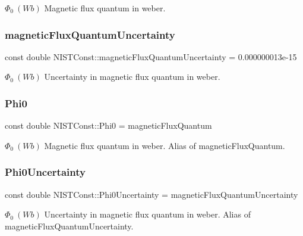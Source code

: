 $\Phi_0 \ (Wb)$ Magnetic flux quantum in weber. \mbox{\label{group___n_i_s_t_const-_magnetic_flux_quantum_gabb501bffb2a565762d9f4bde15f859b6}} 
\subsubsection{\texorpdfstring{magnetic\+Flux\+Quantum\+Uncertainty}{magneticFluxQuantumUncertainty}}
{\footnotesize\ttfamily const double N\+I\+S\+T\+Const\+::magnetic\+Flux\+Quantum\+Uncertainty = 0.\+000000013e-\/15}

$\Phi_0 \ (Wb)$ Uncertainty in magnetic flux quantum in weber. \mbox{\label{group___n_i_s_t_const-_magnetic_flux_quantum_ga17c4e5dc1a9ccc86990f9236ffbc42a3}} 
\subsubsection{\texorpdfstring{Phi0}{Phi0}}
{\footnotesize\ttfamily const double N\+I\+S\+T\+Const\+::\+Phi0 = magnetic\+Flux\+Quantum}

$\Phi_0 \ (Wb)$ Magnetic flux quantum in weber. Alias of magnetic\+Flux\+Quantum. \mbox{\label{group___n_i_s_t_const-_magnetic_flux_quantum_ga55c653d0966d0e6adb13e664c811d394}} 
\subsubsection{\texorpdfstring{Phi0\+Uncertainty}{Phi0Uncertainty}}
{\footnotesize\ttfamily const double N\+I\+S\+T\+Const\+::\+Phi0\+Uncertainty = magnetic\+Flux\+Quantum\+Uncertainty}

$\Phi_0 \ (Wb)$ Uncertainty in magnetic flux quantum in weber. Alias of magnetic\+Flux\+Quantum\+Uncertainty. 